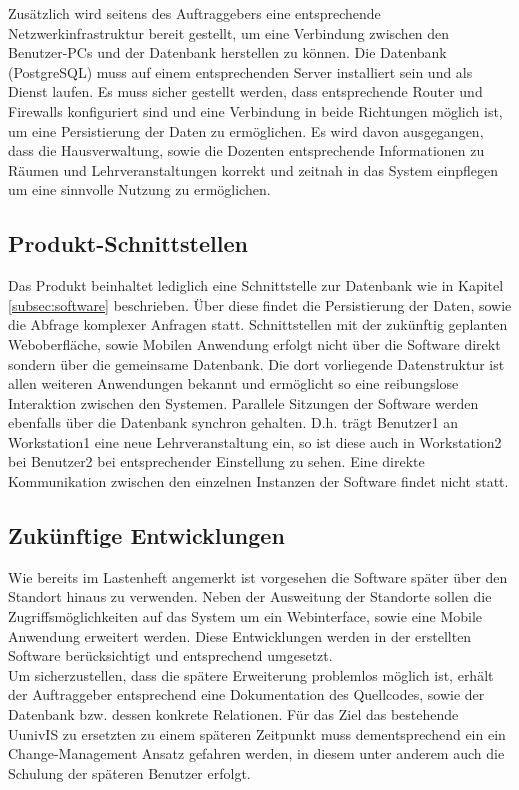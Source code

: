 Zusätzlich wird seitens des Auftraggebers eine entsprechende Netzwerkinfrastruktur bereit gestellt,  um eine Verbindung zwischen den Benutzer-PCs und der Datenbank herstellen zu können.
Die Datenbank (PostgreSQL) muss auf einem entsprechenden Server installiert sein und als Dienst laufen. Es muss sicher gestellt werden, dass entsprechende Router und Firewalls konfiguriert sind und eine Verbindung in beide Richtungen möglich ist, um eine Persistierung der Daten zu ermöglichen. 
Es wird davon ausgegangen, dass die Hausverwaltung, sowie die Dozenten entsprechende Informationen zu Räumen und Lehrveranstaltungen korrekt und zeitnah in das System einpflegen um eine sinnvolle Nutzung zu ermöglichen.

\subsection{Produkt-Schnittstellen}
\label{subsec:productinterface}

Das Produkt beinhaltet lediglich eine Schnittstelle zur Datenbank wie in Kapitel \ref{subsec:software} beschrieben. Über diese findet die Persistierung der Daten, sowie die Abfrage komplexer Anfragen statt.
Schnittstellen mit der zukünftig geplanten Weboberfläche, sowie Mobilen Anwendung erfolgt nicht über die Software direkt sondern über die gemeinsame Datenbank. Die dort vorliegende Datenstruktur ist allen weiteren Anwendungen bekannt und ermöglicht so eine reibungslose Interaktion zwischen den Systemen.
Parallele Sitzungen der Software werden ebenfalls über die Datenbank synchron gehalten. D.h. trägt Benutzer1 an Workstation1 eine neue Lehrveranstaltung ein, so ist diese auch in Workstation2 bei Benutzer2 bei entsprechender Einstellung zu sehen. Eine direkte Kommunikation zwischen den einzelnen Instanzen der Software findet nicht statt.

\subsection{Zukünftige Entwicklungen}
\label{subsec:zukunftentw}

Wie bereits im Lastenheft angemerkt ist vorgesehen die Software später über den Standort hinaus zu verwenden.
Neben der Ausweitung der Standorte sollen die Zugriffsmöglichkeiten auf das System um ein Webinterface, sowie eine Mobile Anwendung erweitert werden.
Diese Entwicklungen werden in der erstellten Software berücksichtigt und entsprechend umgesetzt.\\

Um sicherzustellen, dass die spätere Erweiterung problemlos möglich ist, erhält der Auftraggeber entsprechend eine Dokumentation des Quellcodes, sowie der Datenbank bzw. dessen konkrete Relationen.
Für das Ziel das bestehende UunivIS zu ersetzten zu einem späteren Zeitpunkt muss dementsprechend ein ein Change-Management Ansatz gefahren werden, in diesem unter anderem auch die Schulung der späteren Benutzer erfolgt.
